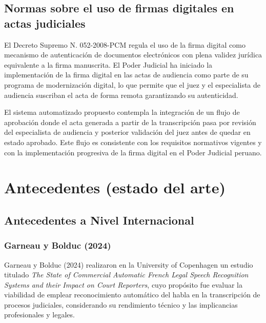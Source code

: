 \documentclass[12pt,a4paper,oneside]{article}
\begin{document}
\subsection{Normas sobre el uso de firmas digitales en actas judiciales}

El Decreto Supremo N.\textordmasculine{} 052-2008-PCM regula el uso de la firma digital como mecanismo de autenticaci\'on de documentos electr\'onicos con plena validez jur\'idica equivalente a la firma manuscrita. El Poder Judicial ha iniciado la implementaci\'on de la firma digital en las actas de audiencia como parte de su programa de modernizaci\'on digital, lo que permite que el juez y el especialista de audiencia suscriban el acta de forma remota garantizando su autenticidad.

El sistema automatizado propuesto contempla la integraci\'on de un flujo de aprobaci\'on donde el acta generada a partir de la transcripci\'on pasa por revisi\'on del especialista de audiencia y posterior validaci\'on del juez antes de quedar en estado aprobado. Este flujo es consistente con los requisitos normativos vigentes y con la implementaci\'on progresiva de la firma digital en el Poder Judicial peruano.


\section{Antecedentes (estado del arte)}

\subsection{Antecedentes a Nivel Internacional}

\subsubsection{Garneau y Bolduc (2024)}

Garneau y Bolduc (2024) realizaron en la University of Copenhagen un estudio titulado \textit{The State of Commercial Automatic French Legal Speech Recognition Systems and their Impact on Court Reporters}, cuyo prop\'osito fue evaluar la viabilidad de emplear reconocimiento autom\'atico del habla en la transcripci\'on de procesos judiciales, considerando su rendimiento t\'ecnico y las implicancias profesionales y legales.
\end{document}
